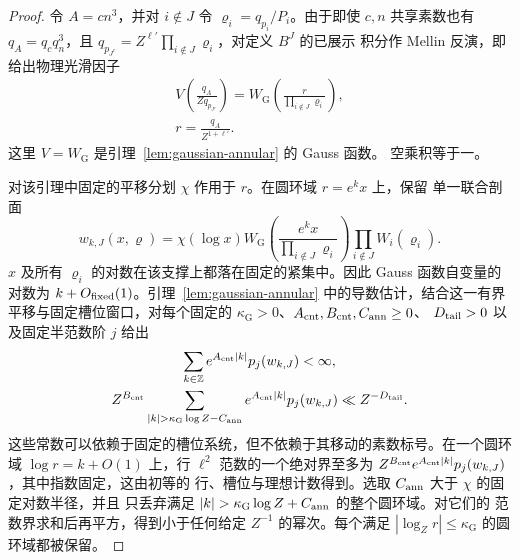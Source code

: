 \documentclass[11pt,a4paper]{article}
\numberwithin{equation}{section}
\numberwithin{figure}{section}
\theoremstyle{definition}
\theoremstyle{remark}
\begin{document}
\begin{proof}
令 $A=cn^3$，并对 $i\notin J$ 令 $\varrho_i=q_{p_i}/P_i$。由于即使 $c,n$
共享素数也有 $q_A=q_cq_n^3$，且
$q_{p_{J^c}}=Z^{\ell'}\prod_{i\notin J}\varrho_i$，对定义 $B^J$ 的已展示
积分作 Mellin 反演，即给出物理光滑因子
\[
 \begin{gathered}
 V\!\left(\frac{q_A}{Zq_{p_{J^c}}}\right)
 =W_{\mathrm G}\!\left(\frac{r}{\prod_{i\notin J}\varrho_i}\right),\\
 r=\frac{q_A}{Z^{1+\ell'}}.
 \end{gathered}
\]
这里 $V=W_{\mathrm G}$ 是引理~\ref{lem:gaussian-annular} 的 Gauss 函数。
空乘积等于一。

对该引理中固定的平移分划 $\chi$ 作用于 $r$。在圆环域 $r=e^kx$ 上，保留
单一联合剖面
\[
 w_{k,J}(x,\boldsymbol\varrho)
 =\chi(\log x)W_{\mathrm G}\!\left(
       \frac{e^kx}{\prod_{i\notin J}\varrho_i}\right)
       \prod_{i\notin J}W_i(\varrho_i).
\]
$x$ 及所有 $\varrho_i$ 的对数在该支撑上都落在固定的紧集中。因此 Gauss
函数自变量的对数为 $k+O_{\rm fixed}(1)$。引理~\ref{lem:gaussian-annular}
中的导数估计，结合这一有界平移与固定槽位窗口，对每个固定的
$\kappa_{\mathrm G}>0$、$A_{\rm cnt},B_{\rm cnt},C_{\rm ann}\ge0$、
$D_{\rm tail}>0$ 以及固定半范数阶 $j$ 给出
\[
 \begin{gathered}
 \sum_{k\in\mathbb Z}e^{A_{\rm cnt}|k|}p_j(w_{k,J})<\infty,
 \\
 Z^{B_{\rm cnt}}
 \sum_{|k|>\kappa_{\mathrm G}\log Z-C_{\rm ann}}
       e^{A_{\rm cnt}|k|}p_j(w_{k,J})
       \ll Z^{-D_{\rm tail}}.
 \end{gathered}
\]
这些常数可以依赖于固定的槽位系统，但不依赖于其移动的素数标号。在一个圆环域
$\log r=k+O(1)$ 上，行 $\ell^2$ 范数的一个绝对界至多为
$Z^{B_{\rm cnt}}e^{A_{\rm cnt}|k|}p_j(w_{k,J})$，其中指数固定，这由初等的
行、槽位与理想计数得到。选取 $C_{\rm ann}$ 大于 $\chi$ 的固定对数半径，并且
只丢弃满足 $|k|>\kappa_{\mathrm G}\log Z+C_{\rm ann}$ 的整个圆环域。对它们的
范数界求和后再平方，得到小于任何给定 $Z^{-1}$ 的幂次。每个满足
$|\log_Z r|\le\kappa_{\mathrm G}$ 的圆环域都被保留。


\end{proof}
\end{document}
